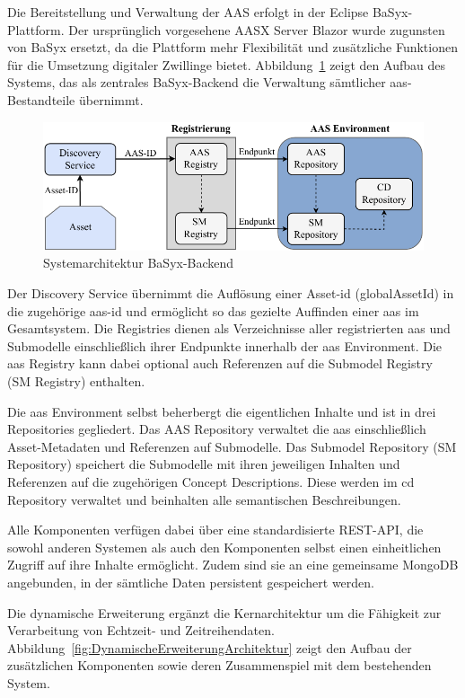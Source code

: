 Die Bereitstellung und Verwaltung der AAS erfolgt in der Eclipse BaSyx-Plattform.
Der ursprünglich vorgesehene AASX Server Blazor wurde zugunsten von BaSyx ersetzt, da die Plattform mehr Flexibilität und zusätzliche Funktionen für die Umsetzung digitaler Zwillinge bietet.
Abbildung~\ref{fig:BaSyxArchitektur} zeigt den Aufbau des Systems, das als zentrales BaSyx-Backend die Verwaltung sämtlicher \acs{aas}-Bestandteile übernimmt.
\newpage
\begin{figure}[htbp]
    \centering
        \includegraphics[width=1\textwidth]{Bilder/Ergebnisse/Systemarchitektur/BaSyx.pdf}
    \caption{Systemarchitektur BaSyx-Backend}
    \label{fig:BaSyxArchitektur}
\end{figure}

Der Discovery Service übernimmt die Auflösung einer Asset-\acs{id} (globalAssetId) in die zugehörige \acs{aas}-\acs{id} und ermöglicht so das gezielte Auffinden einer \acs{aas} im Gesamtsystem. 
Die Registries dienen als Verzeichnisse aller registrierten \acs{aas} und Submodelle einschließlich ihrer Endpunkte innerhalb der \acs{aas} Environment. Die \acs{aas} Registry kann dabei optional auch Referenzen auf die Submodel Registry (SM Registry) enthalten.

Die \acs{aas} Environment selbst beherbergt die eigentlichen Inhalte und ist in drei Repositories gegliedert. 
Das AAS Repository verwaltet die \acs{aas} einschließlich Asset-Metadaten und Referenzen auf Submodelle. 
Das Submodel Repository (SM Repository) speichert die Submodelle mit ihren jeweiligen Inhalten und Referenzen auf die zugehörigen Concept Descriptions. 
Diese werden im \acs{cd} Repository verwaltet und beinhalten alle semantischen Beschreibungen.

Alle Komponenten verfügen dabei über eine standardisierte REST-API, die sowohl anderen Systemen als auch den Komponenten selbst einen einheitlichen Zugriff auf ihre Inhalte ermöglicht. 
Zudem sind sie an eine gemeinsame MongoDB angebunden, in der sämtliche Daten persistent gespeichert werden.

Die dynamische Erweiterung ergänzt die Kernarchitektur um die Fähigkeit zur Verarbeitung von Echtzeit- und Zeitreihendaten. 
Abbildung~\ref{fig:DynamischeErweiterungArchitektur} zeigt den Aufbau der zusätzlichen Komponenten sowie deren Zusammenspiel mit dem bestehenden System.

